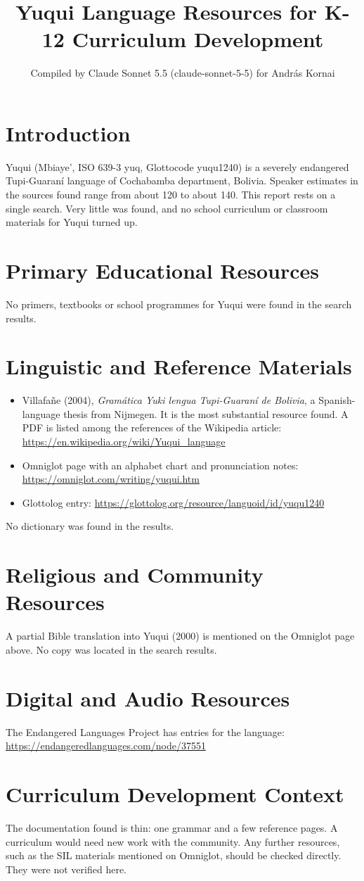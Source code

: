 \documentclass[12pt]{article}
\title{Yuqui Language Resources for K-12 Curriculum Development}
\author{Compiled by Claude Sonnet 5.5 (claude-sonnet-5-5) for Andr\'as Kornai}
\date{}
\begin{document}
\maketitle

\section{Introduction}
Yuqui (Mbiaye', ISO 639-3 yuq, Glottocode yuqu1240) is a severely endangered Tupi-Guaran\'i language of Cochabamba department, Bolivia. Speaker estimates in the sources found range from about 120 to about 140. This report rests on a single search. Very little was found, and no school curriculum or classroom materials for Yuqui turned up.

\section{Primary Educational Resources}
No primers, textbooks or school programmes for Yuqui were found in the search results.

\section{Linguistic and Reference Materials}
\begin{itemize}
\item Villafa\~ne (2004), \emph{Gram\'atica Yuki lengua Tupi-Guaran\'i de Bolivia}, a Spanish-language thesis from Nijmegen. It is the most substantial resource found. A PDF is listed among the references of the Wikipedia article: \url{https://en.wikipedia.org/wiki/Yuqui_language}
\item Omniglot page with an alphabet chart and pronunciation notes: \url{https://omniglot.com/writing/yuqui.htm}
\item Glottolog entry: \url{https://glottolog.org/resource/languoid/id/yuqu1240}
\end{itemize}
No dictionary was found in the results.

\section{Religious and Community Resources}
A partial Bible translation into Yuqui (2000) is mentioned on the Omniglot page above. No copy was located in the search results.

\section{Digital and Audio Resources}
The Endangered Languages Project has entries for the language: \url{https://endangeredlanguages.com/node/37551}

\section{Curriculum Development Context}
The documentation found is thin: one grammar and a few reference pages. A curriculum would need new work with the community. Any further resources, such as the SIL materials mentioned on Omniglot, should be checked directly. They were not verified here.
\end{document}
